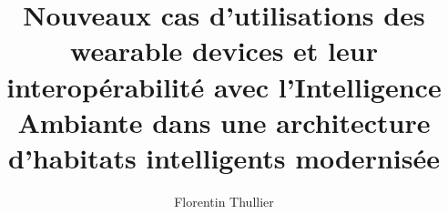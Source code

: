 \documentclass[12pt,times,these,french]{uqac}
\begin{document}
\title{Nouveaux cas d'utilisations des wearable devices et leur interopérabilité avec l’Intelligence Ambiante dans une architecture d'habitats intelligents modernisée}


\author{Florentin Thullier}

\maketitle

\opening


\tableofcontents
\listoftables
\listoffigures
\listofacro


%

\maincontent













\appendix


\end{document}
